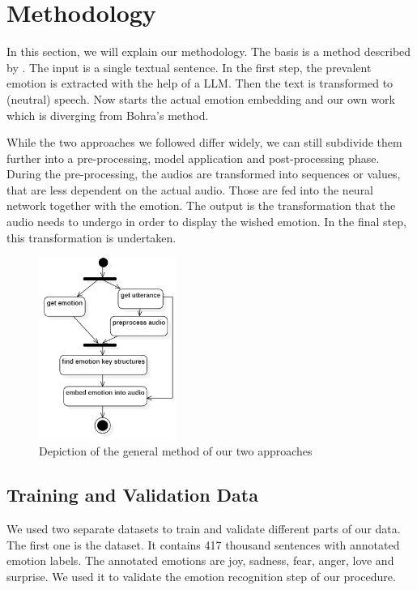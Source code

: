 \documentclass[11pt]{article}
\begin{document}
\section{Methodology}
\label{methodology}
In this section, we will explain our methodology. The basis is a method described by \cite{bohra_smart_2022}. The input is a single textual sentence. In the first step, the prevalent emotion is extracted with the help of a LLM. Then the text is transformed to (neutral) speech. Now starts the actual emotion embedding and our own work which is diverging from Bohra's method.

While the two approaches we followed differ widely, we can still subdivide them further into a pre-processing, model application and post-processing phase. During the pre-processing, the audios are transformed into sequences or values, that are less dependent on the actual audio. Those are fed into the neural network together with the emotion. The output is the transformation that the audio needs to undergo in order to display the wished emotion. In the final step, this transformation is undertaken.

\begin{figure}[h]
 \centering
\includegraphics[width=0.4\textwidth]{"Bilder/Prozess.PNG"}
\caption{Depiction of the general method of our two approaches}
\label{Ablauf}
\end{figure}

\subsection{Training and Validation Data}
We used two separate datasets to train and validate different parts of our data.
The first one is the \cite{saravia-etal-2018-carer} dataset. It contains 417 thousand sentences with annotated emotion labels. The annotated emotions are joy, sadness, fear, anger, love and surprise. We used it to validate the emotion recognition step of our procedure.
\end{document}
